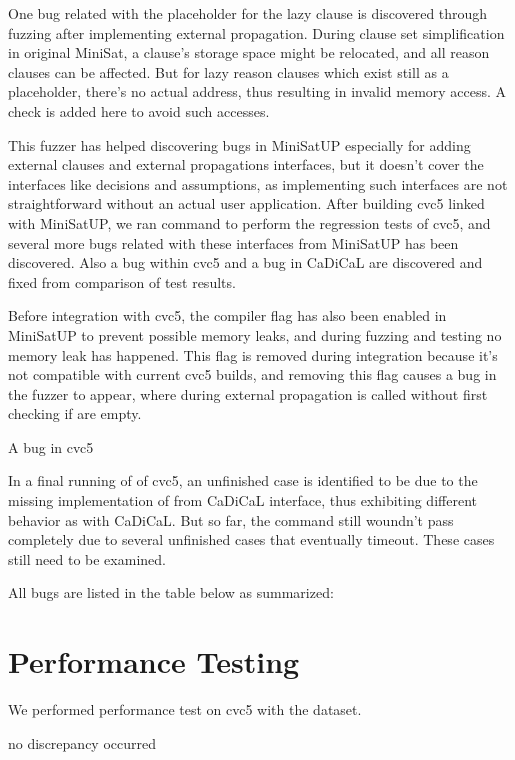 One bug related with the placeholder for the lazy clause is discovered through fuzzing after implementing external propagation. During clause set simplification in original MiniSat, a clause's storage space might be relocated, and all reason clauses can be affected. But for lazy reason clauses which exist still as a placeholder, there's no actual address, thus resulting in invalid memory access. A check is added here to avoid such accesses.

This fuzzer has helped discovering bugs in MiniSatUP especially for adding external clauses and external propagations interfaces, but it doesn't cover the interfaces like decisions and assumptions, as implementing such interfaces are not straightforward without an actual user application. After building cvc5 linked with MiniSatUP, we ran  command to perform the regression tests of cvc5, and several more bugs related with these interfaces from MiniSatUP has been discovered. Also a bug within cvc5 and a bug in CaDiCaL are discovered and fixed from comparison of test results.

Before integration with cvc5, the compiler flag  has also been enabled in MiniSatUP to prevent possible memory leaks, and during fuzzing and testing no memory leak has happened. This flag is removed during integration because it's not compatible with current cvc5 builds, and removing this flag causes a bug in the fuzzer to appear, where during external propagation  is called without first checking if  are empty.


A bug in cvc5 


In a final running of  of cvc5, an unfinished case is identified to be due to the missing implementation of  from CaDiCaL interface, thus exhibiting different behavior as with CaDiCaL. But so far, the  command still woundn't pass completely due to several unfinished cases that eventually timeout. These cases still need to be examined.

All bugs are listed in the table below as summarized:


\section{Performance Testing}


We performed performance test on cvc5 with the dataset.


no discrepancy occurred
